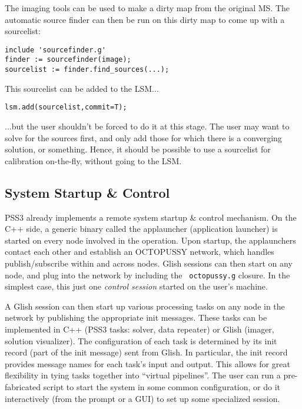 \documentclass[12pt]{article}
\begin{document}
  The imaging tools can be used to make a dirty map from the original MS. The
  automatic source finder can then be run on this dirty map to come up with a
  sourcelist:

\begin{verbatim}
include 'sourcefinder.g'
finder := sourcefinder(image);
sourcelist := finder.find_sources(...);
\end{verbatim}

  This sourcelist can be added to the LSM...
  
\begin{verbatim}
lsm.add(sourcelist,commit=T);
\end{verbatim}

  ...but the user shouldn't be forced to do it at this stage. The user may want
  to solve for the sources first, and only add those for which there is a 
  converging solution, or something. Hence, it should be possible to use a
  sourcelist for calibration on-the-fly, without going to the LSM.

\subsection{System Startup \& Control}
\label{sec:startup}

  PSS3 already implements a remote system startup \& control mechanism. On
  the C++ side, a generic binary called the applauncher (application launcher)
  is started on every node involved in the operation. Upon startup, the
  applaunchers contact each other and establish an OCTOPUSSY network, which
  handles publish/subscribe within and across nodes. Glish sessions can then
  start on any node, and plug into the network by including the {\tt
  octopussy.g} closure. In the simplest case, this just one {\em control
  session} started on the user's machine. 

  A Glish session can then start up various processing tasks on any node in the
  network by publishing the appropriate init messages. These tasks can be
  implemented in C++ (PSS3 tasks: solver, data repeater) or Glish (imager,
  solution visualizer). The configuration of each task is determined by its
  init record (part of the init message) sent from Glish. In particular, the
  init record provides message names for each task's input and output. This
  allows for great flexibility in tying tasks together into ``virtual
  pipelines''. The user can run a pre-fabricated script to start the system in
  some common configuration, or do it interactively (from the prompt or a GUI)
  to set up some specialized session.
  
\end{document}
